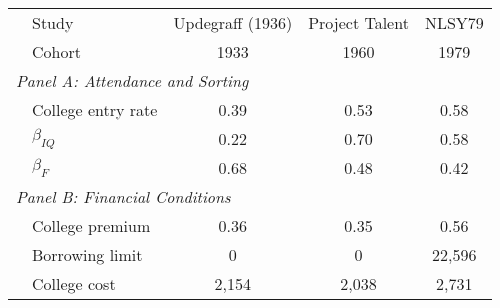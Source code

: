 \begin{tabular}{llccc}
\hline \hline
&Study & Updegraff (1936) & Project Talent & NLSY79 \\ 
&Cohort & 1933 & 1960 & 1979 \\\hline
\multicolumn{5}{l}{\textit{Panel A: Attendance and Sorting}} \\ 
&College entry rate & 0.39  & 0.53  & 0.58   \\ 
&$\beta_{IQ}$ & 0.22  & 0.70  & 0.58     \\ 
&$\beta_{F}$ & 0.68  & 0.48  & 0.42    \\ \hline
\multicolumn{5}{l}{\textit{Panel B: Financial Conditions}} \\ 
&College premium & 0.36  & 0.35  & 0.56     \\ 
&Borrowing limit & 0  & 0  & 22,596   \\ 
&College cost & 2,154  & 2,038 & 2,731    \\ 
\hline
\end{tabular}
